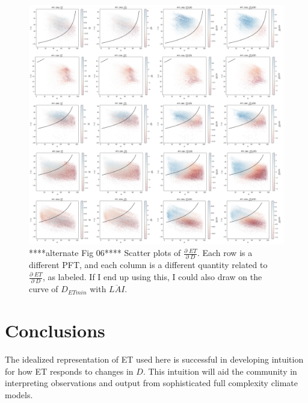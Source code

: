 \documentclass[draft,linenumbers]{agujournal}
\begin{document}
\begin{figure}[h]
\centering
\includegraphics[width=\textwidth]{./fig06b.png}
\caption{****alternate Fig 06****  Scatter plots of $\frac{\partial \; ET}{\partial \; D}$. Each row is a different PFT, and each column is a different quantity related to $\frac{\partial \; ET}{\partial \; D}$, as labeled. If I end up using this, I could also draw on the curve of $D_{ETmin}$ with $\overline{LAI}$. }
\label{real2}
\end{figure}


\section{Conclusions} 

The idealized representation of ET used here is successful in developing intuition for how ET responds to changes in $D$. This intuition will aid the community in interpreting observations and output from sophisticated full complexity climate models.
\end{document}
